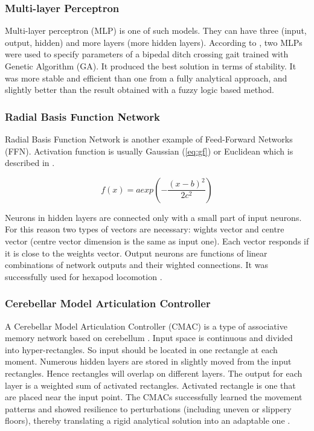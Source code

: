 \documentclass[12pt,a4paper]{report}
\begin{document}
				\subsubsection{Multi-layer Perceptron}
					Multi-layer perceptron (MLP) is one of such models. They can have three (input, output, hidden) and more layers (more hidden layers). According to \cite{vundavilli2010dynamically}, two MLPs were used to specify parameters of a bipedal ditch crossing gait trained with Genetic Algorithm (GA). It produced the best solution in terms of stability. It was more stable and efficient than one from a fully analytical approach, and slightly better than the result obtained with a fuzzy logic based method.
				\subsubsection{Radial Basis Function Network}
					Radial Basis Function Network is another example of Feed-Forward Networks (FFN). Activation function is usually Gaussian (\ref{eq:gf}) or Euclidean which is described in \cite{EuclideanFunction}.
					
					\begin{equation}\label{eq:gf}
						f(x) = a exp \left(  - \dfrac{(x - b)^2}{2c^2} \right)
					\end{equation}
					
					Neurons in hidden layers are connected only with a small part of input neurons. For this reason two types of vectors are necessary: wights vector and centre vector (centre vector dimension is the same as input one). Each vector responds if it is close to the weights vector. Output neurons are functions of linear combinations of network outputs and their wighted connections.
					It was successfully used for hexapod locomotion \cite{ilg1995learning}.
				\subsubsection{Cerebellar Model Articulation Controller}
					A Cerebellar Model Articulation Controller (CMAC) is a type of associative memory network based on cerebellum \cite{albus1975new}. Input space is continuous and divided into hyper-rectangles. So input should be located in one rectangle at each moment. Numerous hidden layers are stored in slightly moved from the input rectangles. Hence rectangles will overlap on different layers. The output for each layer is a weighted sum of activated rectangles. Activated rectangle is one that are placed near the input point. The CMACs successfully learned the movement patterns and showed resilience to perturbations (including uneven or slippery floors), thereby translating a rigid analytical solution into an adaptable one \cite{sabourin2005robustness}.
\end{document}

